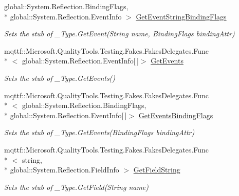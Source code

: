\begin{DoxyCompactItemize}
global\-::\-System.\-Reflection.\-Binding\-Flags, \\*
global\-::\-System.\-Reflection.\-Event\-Info $>$ \hyperlink{class_system_1_1_runtime_1_1_interop_services_1_1_fakes_1_1_stub___type_aa41705a1228c25359f772a5c80c08940}{Get\-Event\-String\-Binding\-Flags}
\begin{DoxyCompactList}\small\item\em Sets the stub of \-\_\-\-Type.\-Get\-Event(\-String name, Binding\-Flags binding\-Attr)\end{DoxyCompactList}\item 
mqttf\-::\-Microsoft.\-Quality\-Tools.\-Testing.\-Fakes.\-Fakes\-Delegates.\-Func\\*
$<$ global\-::\-System.\-Reflection.\-Event\-Info\mbox{[}$\,$\mbox{]}$>$ \hyperlink{class_system_1_1_runtime_1_1_interop_services_1_1_fakes_1_1_stub___type_a82f4b808dd6826e789d42a4be8950df1}{Get\-Events}
\begin{DoxyCompactList}\small\item\em Sets the stub of \-\_\-\-Type.\-Get\-Events()\end{DoxyCompactList}\item 
mqttf\-::\-Microsoft.\-Quality\-Tools.\-Testing.\-Fakes.\-Fakes\-Delegates.\-Func\\*
$<$ global\-::\-System.\-Reflection.\-Binding\-Flags, \\*
global\-::\-System.\-Reflection.\-Event\-Info\mbox{[}$\,$\mbox{]}$>$ \hyperlink{class_system_1_1_runtime_1_1_interop_services_1_1_fakes_1_1_stub___type_a9547d09d38ecab906977c0bf627da4c0}{Get\-Events\-Binding\-Flags}
\begin{DoxyCompactList}\small\item\em Sets the stub of \-\_\-\-Type.\-Get\-Events(\-Binding\-Flags binding\-Attr)\end{DoxyCompactList}\item 
mqttf\-::\-Microsoft.\-Quality\-Tools.\-Testing.\-Fakes.\-Fakes\-Delegates.\-Func\\*
$<$ string, \\*
global\-::\-System.\-Reflection.\-Field\-Info $>$ \hyperlink{class_system_1_1_runtime_1_1_interop_services_1_1_fakes_1_1_stub___type_ad2217e00a94482c0ec42edd726a4766e}{Get\-Field\-String}
\begin{DoxyCompactList}\small\item\em Sets the stub of \-\_\-\-Type.\-Get\-Field(\-String name)\end{DoxyCompactList}\item 

\end{DoxyCompactItemize}
